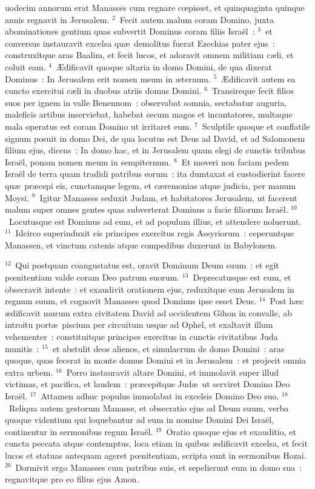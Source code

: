 \bchapter
{}uodecim annorum erat Manasses cum regnare cœpisset, et quinquaginta quinque annis regnavit in Jerusalem.
${}^{2}$~Fecit autem malum coram Domino, juxta abominationes gentium quas subvertit Dominus coram filiis Isra\"el~:
${}^{3}$~et conversus instauravit excelsa qu\ae\ demolitus fuerat Ezechias pater ejus~: construxitque aras Baalim, et fecit lucos, et adoravit omnem militiam c\ae li, et coluit eam.
${}^{4}$~\AE dificavit quoque altaria in domo Domini, de qua dixerat Dominus~: In Jerusalem erit nomen meum in \ae ternum.
${}^{5}$~\AE dificavit autem ea cuncto exercitui c\ae li in duobus atriis domus Domini.
${}^{6}$~Transireque fecit filios suos per ignem in valle Benennom~: observabat somnia, sectabatur auguria, maleficis artibus inserviebat, habebat secum magos et incantatores, multaque mala operatus est coram Domino ut irritaret eum.
${}^{7}$~Sculptile quoque et conflatile signum posuit in domo Dei, de qua locutus est Deus ad David, et ad Salomonem filium ejus, dicens~: In domo hac, et in Jerusalem quam elegi de cunctis tribubus Isra\"el, ponam nomen meum in sempiternum.
${}^{8}$~Et moveri non faciam pedem Isra\"el de terra quam tradidi patribus eorum~: ita dumtaxat si custodierint facere qu\ae\ pr\ae cepi eis, cunctamque legem, et c\ae remonias atque judicia, per manum Moysi.
${}^{9}$~Igitur Manasses seduxit Judam, et habitatores Jerusalem, ut facerent malum super omnes gentes quas subverterat Dominus a facie filiorum Isra\"el.
${}^{10}$~Locutusque est Dominus ad eum, et ad populum illius, et attendere noluerunt.
${}^{11}$~Idcirco superinduxit eis principes exercitus regis Assyriorum~: ceperuntque Manassen, et vinctum catenis atque compedibus duxerunt in Babylonem.


${}^{12}$~Qui postquam coangustatus est, oravit Dominum Deum suum~: et egit pœnitentiam valde coram Deo patrum suorum.
${}^{13}$~Deprecatusque est eum, et obsecravit intente~: et exaudivit orationem ejus, reduxitque eum Jerusalem in regnum suum, et cognovit Manasses quod Dominus ipse esset Deus.
${}^{14}$~Post h\ae c \ae dificavit murum extra civitatem David ad occidentem Gihon in convalle, ab introitu port\ae\ piscium per circuitum usque ad Ophel, et exaltavit illum vehementer~: constituitque principes exercitus in cunctis civitatibus Juda munitis~:
${}^{15}$~et abstulit deos alienos, et simulacrum de domo Domini~: aras quoque, quas fecerat in monte domus Domini et in Jerusalem~: et projecit omnia extra urbem.
${}^{16}$~Porro instauravit altare Domini, et immolavit super illud victimas, et pacifica, et laudem~: pr\ae cepitque Jud\ae\ ut serviret Domino Deo Isra\"el.
${}^{17}$~Attamen adhuc populus immolabat in excelsis Domino Deo suo.
${}^{18}$~Reliqua autem gestorum Manasse, et obsecratio ejus ad Deum suum, verba quoque videntium qui loquebantur ad eum in nomine Domini Dei Isra\"el, continentur in sermonibus regum Isra\"el.
${}^{19}$~Oratio quoque ejus et exauditio, et cuncta peccata atque contemptus, loca etiam in quibus \ae dificavit excelsa, et fecit lucos et statuas antequam ageret pœnitentiam, scripta sunt in sermonibus Hozai.
${}^{20}$~Dormivit ergo Manasses cum patribus suis, et sepelierunt eum in domo sua~: regnavitque pro eo filius ejus Amon.


